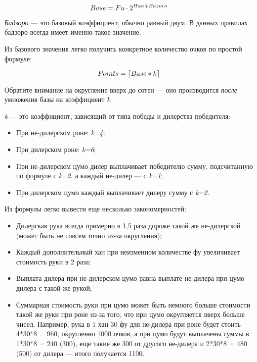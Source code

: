 \begin{equation}
	\large
	Base = Fu \cdot 2 ^ {Han + Bazoro}
\end{equation}

\textit{Бадзоро} --- это базовый коэффициент, обычно равный двум. В данных правилах бадзоро всегда имеет именно такое значение.

Из базового значения легко получить конкретное количество очков по простой формуле:

\begin{equation}
	\large
	Points = \lceil Base * k \rceil
\end{equation}

Обратите внимание на округление вверх до сотен --- оно производится \textit{после} умножения базы на коэффициент \textit{k}. 

\textit{k} --- это коэффициент, зависящий от типа победы и дилерства победителя:
\begin{itemize}
	\item При не-дилерском роне: \textit{k=4};
	\item При дилерском роне: \textit{k=6};
	\item При не-дилерском цумо дилер выплачивает победителю сумму, подсчитанную по формуле с \textit{k=2}, а каждый не-дилер --- с \textit{k=1};
	\item При дилерском цумо каждый выплачивает дилеру сумму с \textit{k=2}.
\end{itemize}

Из формулы легко вывести еще несколько закономерностей:
\begin{itemize}
	\item Дилерская рука всегда примерно в 1,5 раза дороже такой же не-дилерской (может быть не совсем точно из-за округления);
	\item Каждый дополнительный хан при неизменном количестве фу увеличивает стоимость руки в 2 раза;
	\item Выплата дилера при не-дилерском цумо равна выплате не-дилера при цумо дилера с такой же рукой;
	\item Суммарная стоимость руки при цумо может быть немного больше стоимости такой же руки при роне из-за того, что при цумо округляется вверх больше чисел. Например, рука в 1 хан 30 фу для не-дилера при роне будет стоить 4*30*8 = 960, округленно 1000 очков, а при цумо будут выплачены суммы в 1*30*8 = 240 (300), еще такие же 300 от другого не-дилера и 2*30*8 = 480
	(500) от дилера --- итого получается 1100.	
\end{itemize}


